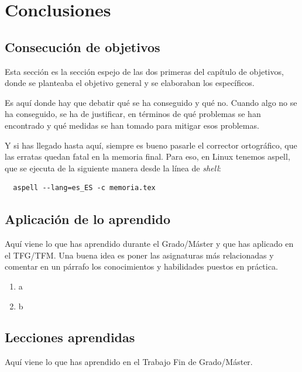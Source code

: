 \documentclass[a4paper, 12pt]{book}
\begin{document}
\cleardoublepage
\chapter{Conclusiones}
\label{chap:conclusiones}


\section{Consecución de objetivos}
\label{sec:consecucion-objetivos}

Esta sección es la sección espejo de las dos primeras del capítulo de objetivos, donde se planteaba el objetivo general y se elaboraban los específicos.

Es aquí donde hay que debatir qué se ha conseguido y qué no. 
Cuando algo no se ha conseguido, se ha de justificar, en términos de qué problemas se han encontrado y qué medidas se han tomado para mitigar esos problemas.

Y si has llegado hasta aquí, siempre es bueno pasarle el corrector ortográfico, que las erratas quedan fatal en la memoria final.
Para eso, en Linux tenemos aspell, que se ejecuta de la siguiente manera desde la línea de \emph{shell}:

\begin{verbatim}
  aspell --lang=es_ES -c memoria.tex
\end{verbatim}

\section{Aplicación de lo aprendido}
\label{sec:aplicacion}

Aquí viene lo que has aprendido durante el Grado/Máster y que has aplicado en el TFG/TFM.
Una buena idea es poner las asignaturas más relacionadas y comentar en un párrafo los conocimientos y habilidades puestos en práctica.

\begin{enumerate}
  \item a
  \item b
\end{enumerate}


\section{Lecciones aprendidas}
\label{sec:lecciones_aprendidas}

Aquí viene lo que has aprendido en el Trabajo Fin de Grado/Máster.
\end{document}
